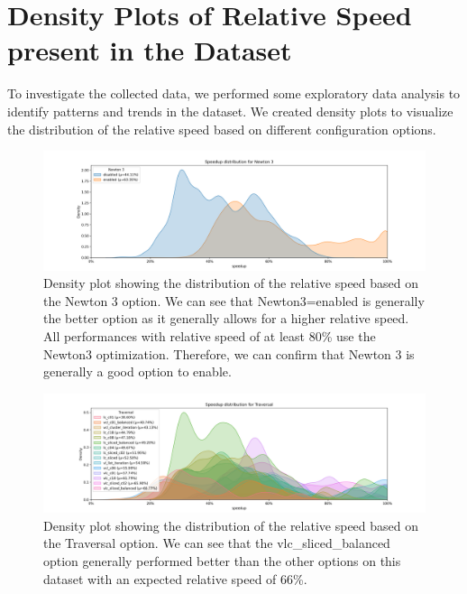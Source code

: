 \section{Density Plots of Relative Speed present in the Dataset}

To investigate the collected data, we performed some exploratory data analysis to identify patterns and trends in the dataset. We created density plots to visualize the distribution of the relative speed based on different configuration options.

\begin{figure}[H]
  \centering
  \includegraphics[width=\columnwidth,trim={1cm 0 2cm 1.5cm},clip]{figures/DataAnalytics/speedup_Newton 3.png}
  \caption[Speedup density plot based on the Newton 3 option]{Density plot showing the distribution of the relative speed based on the Newton 3 option. We can see that Newton3=enabled is generally the better option as it generally allows for a higher relative speed. All performances with relative speed of at least 80\% use the Newton3 optimization. Therefore, we can confirm that Newton 3 is generally a good option to enable.}
  \label{fig:inputAnalysisDensityNewton3}
\end{figure}

\begin{figure}[H]
  \centering
  \includegraphics[width=\columnwidth,trim={1cm 0 2cm 1.5cm},clip]{figures/DataAnalytics/speedup_Traversal.png}
  \caption[Speedup density plot based on the Traversal option]{Density plot showing the distribution of the relative speed based on the Traversal option. We can see that the vlc\_sliced\_balanced option generally performed better than the other options on this dataset with an expected relative speed of 66\%.}
  \label{fig:inputAnalysisDensityTraversal}
\end{figure}

